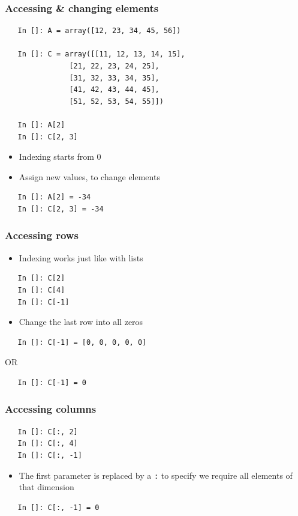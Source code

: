 \begin{frame}[fragile]
  \frametitle{Accessing \& changing elements}
  \begin{lstlisting}
   In []: A = array([12, 23, 34, 45, 56])

   In []: C = array([[11, 12, 13, 14, 15],
               [21, 22, 23, 24, 25],
               [31, 32, 33, 34, 35],
               [41, 42, 43, 44, 45],
               [51, 52, 53, 54, 55]])

   In []: A[2]
   In []: C[2, 3]
  \end{lstlisting}
  \begin{itemize}
  \item Indexing starts from 0
  \item Assign new values, to change elements
  \end{itemize}
  \begin{lstlisting}
   In []: A[2] = -34
   In []: C[2, 3] = -34
  \end{lstlisting}
\end{frame}

\begin{frame}[fragile]
  \frametitle{Accessing rows}
  \begin{itemize}
  \item Indexing works just like with lists
  \end{itemize}
  \begin{lstlisting}
   In []: C[2]
   In []: C[4]
   In []: C[-1]
  \end{lstlisting}
  \begin{itemize}
  \item Change the last row into all zeros
  \end{itemize}
  \begin{lstlisting}
   In []: C[-1] = [0, 0, 0, 0, 0]
  \end{lstlisting}
  OR
  \begin{lstlisting}
   In []: C[-1] = 0
  \end{lstlisting}
\end{frame}

\begin{frame}[fragile]
  \frametitle{Accessing columns}
  \begin{lstlisting}
   In []: C[:, 2]
   In []: C[:, 4]
   In []: C[:, -1]
  \end{lstlisting}
  \begin{itemize}
  \item The first parameter is replaced by a \texttt{:} to specify we
    require all elements of that dimension
  \end{itemize}
  \begin{lstlisting}
   In []: C[:, -1] = 0
  \end{lstlisting}
\end{frame}

